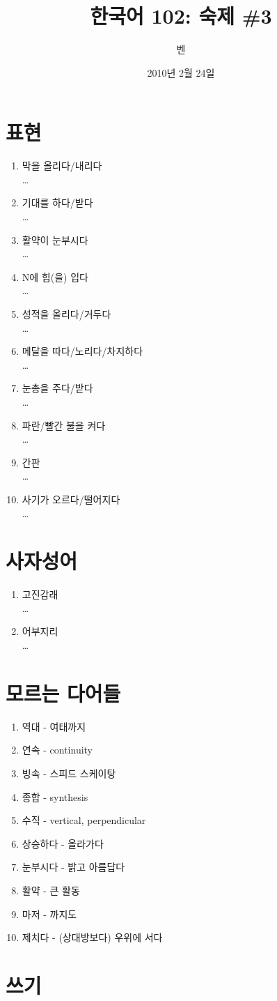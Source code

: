 \documentclass[11pt]{article}
\title{한국어 102: 숙제 \#3}
\author{벤}
\date{2010년 2월 24일}
\begin{document}
\maketitle
\thispagestyle{empty}
\pagestyle{empty}

\section{표현}
\begin{enumerate}
  \item 막을 올리다/내리다 \\
    \ldots
  \item 기대를 하다/받다 \\
    \ldots
  \item 활약이 눈부시다 \\
    \ldots
  \item N에 힘(을) 입다 \\
    \ldots
  \item 성적을 올리다/거두다 \\
    \ldots
  \item 메달을 따다/노리다/차지하다 \\
    \ldots
  \item 눈총을 주다/받다 \\
    \ldots
  \item 파란/빨간 불을 켜다 \\
    \ldots
  \item 간판 \\
    \ldots
  \item 사기가 오르다/떨어지다 \\
    \ldots
\end{enumerate}

\section{사자성어}
\begin{enumerate}
  \item 고진감래 \\
    \ldots
  \item 어부지리 \\
    \ldots
\end{enumerate}

\section{모르는 다어들}
\begin{enumerate}
  \item 역대 - 여태까지
  \item 연속 - continuity
  \item 빙속 - 스피드 스케이탕
  \item 종합 - synthesis
  \item 수직 - vertical, perpendicular
  \item 상승하다 - 올라가다
  \item 눈부시다 - 밝고 아름답다
  \item 활약 - 큰 활동
  \item 마저 - 까지도
  \item 제치다 - (상대방보다) 우위에 서다 
\end{enumerate}

\section{쓰기}
\doublespacing
\end{document}

